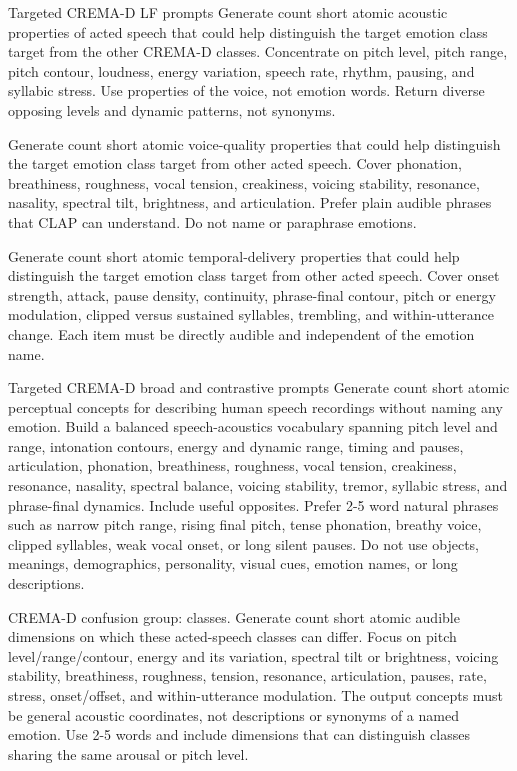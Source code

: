 \documentclass[10pt]{article}
\begin{document}
\begin{prompt}{Targeted CREMA-D LF prompts}
Generate {count} short atomic acoustic properties of acted speech that could help distinguish the target emotion class {target} from the other CREMA-D classes. Concentrate on pitch level, pitch range, pitch contour, loudness, energy variation, speech rate, rhythm, pausing, and syllabic stress. Use properties of the voice, not emotion words. Return diverse opposing levels and dynamic patterns, not synonyms.

Generate {count} short atomic voice-quality properties that could help distinguish the target emotion class {target} from other acted speech. Cover phonation, breathiness, roughness, vocal tension, creakiness, voicing stability, resonance, nasality, spectral tilt, brightness, and articulation. Prefer plain audible phrases that CLAP can understand. Do not name or paraphrase emotions.

Generate {count} short atomic temporal-delivery properties that could help distinguish the target emotion class {target} from other acted speech. Cover onset strength, attack, pause density, continuity, phrase-final contour, pitch or energy modulation, clipped versus sustained syllables, trembling, and within-utterance change. Each item must be directly audible and independent of the emotion name.
\end{prompt}

\begin{prompt}{Targeted CREMA-D broad and contrastive prompts}
Generate {count} short atomic perceptual concepts for describing human speech recordings without naming any emotion. Build a balanced speech-acoustics vocabulary spanning pitch level and range, intonation contours, energy and dynamic range, timing and pauses, articulation, phonation, breathiness, roughness, vocal tension, creakiness, resonance, nasality, spectral balance, voicing stability, tremor, syllabic stress, and phrase-final dynamics. Include useful opposites. Prefer 2-5 word natural phrases such as narrow pitch range, rising final pitch, tense phonation, breathy voice, clipped syllables, weak vocal onset, or long silent pauses. Do not use objects, meanings, demographics, personality, visual cues, emotion names, or long descriptions.

CREMA-D confusion group: {classes}. Generate {count} short atomic audible dimensions on which these acted-speech classes can differ. Focus on pitch level/range/contour, energy and its variation, spectral tilt or brightness, voicing stability, breathiness, roughness, tension, resonance, articulation, pauses, rate, stress, onset/offset, and within-utterance modulation. The output concepts must be general acoustic coordinates, not descriptions or synonyms of a named emotion. Use 2-5 words and include dimensions that can distinguish classes sharing the same arousal or pitch level.
\end{prompt}
\end{document}
